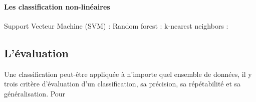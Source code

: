 \documentclass[a4paper,twoside]{report}
\begin{document}
\paragraph{Les classification non-linéaires\newline}
Support Vecteur Machine (SVM) : 
Random forest :
k-nearest neighbors :
\subsection{L'évaluation}
Une classification peut-être appliquée à n'importe quel ensemble de données, il y trois critère d'évaluation d'un classification, sa précision, sa répétabilité et sa généralisation. Pour 
\end{document}
